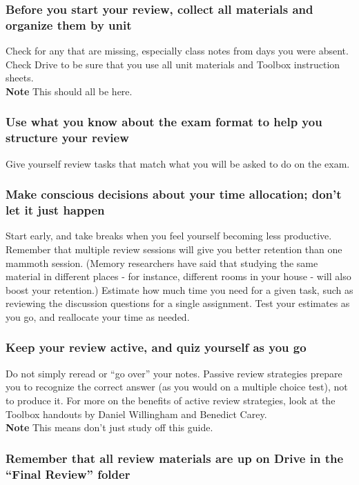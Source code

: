 \documentclass{article}
\begin{document}
  \subsubsection{Before you start your review, collect all materials and organize them by unit}
  Check for any that are missing, especially class notes from days you were absent.
  Check Drive to be sure that you use all unit materials and Toolbox instruction sheets. \\
  \textbf{Note} This should all be here.
  \subsubsection{Use what you know about the exam format to help you structure your review}
  Give yourself review tasks that match what you will be asked to do on the exam.
  \subsubsection{Make conscious decisions about your time allocation; don’t let it just happen}
  Start early, and take breaks when you feel yourself becoming less productive.
  Remember that multiple review sessions will give you better retention than one
  mammoth session. (Memory researchers have said that studying the same material in
  different places - for instance, different rooms in your house - will also boost your
  retention.) Estimate how much time you need for a given task, such as reviewing the
  discussion questions for a single assignment. Test your estimates as you go, and
  reallocate your time as needed.
  \subsubsection{Keep your review active, and quiz yourself as you go}
  Do not simply reread or “go over” your notes.  Passive review strategies prepare you to
  recognize the correct answer (as you would on a multiple choice test), not to produce it.
  For more on the benefits of active review strategies, look at the Toolbox handouts by
  Daniel Willingham and Benedict Carey. \\
  \textbf{Note} This means don't just study off this guide.
  \subsubsection{Remember that all review materials are up on Drive in the “Final Review” folder}
\end{document}
